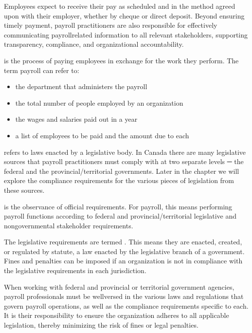 \documentclass[letterpaper,10pt,english]{sphinxmanual}
\begin{document}
\sphinxAtStartPar
Employees expect to receive their pay as scheduled and in the method agreed upon with their employer, whether by cheque or
direct deposit. Beyond ensuring timely payment, payroll practitioners are also responsible for effectively communicating
payroll\sphinxhyphen{}related information to all relevant stakeholders, supporting transparency, compliance, and organizational
accountability.

\sphinxAtStartPar
{} is the process of paying employees in exchange for the work they perform. The
term payroll can refer to:
\begin{itemize}
\item {} 
\sphinxAtStartPar
the department that administers the payroll

\item {} 
\sphinxAtStartPar
the total number of people employed by an organization

\item {} 
\sphinxAtStartPar
the wages and salaries paid out in a year

\item {} 
\sphinxAtStartPar
a list of employees to be paid and the amount due to each

\end{itemize}

\sphinxAtStartPar
{} refers to laws enacted by a legislative body. In Canada there are many legislative
sources that payroll practitioners must comply with at two separate levels ─ the federal and
the provincial/territorial governments. Later in the chapter we will explore the compliance
requirements for the various pieces of legislation from these sources.

\sphinxAtStartPar
{} is the observance of official requirements. For payroll, this means
performing payroll functions according to federal and provincial/territorial legislative and
non\sphinxhyphen{}governmental stakeholder requirements.

\sphinxAtStartPar
The legislative requirements are termed . This means they are enacted, created, or
regulated by statute, a law enacted by the legislative branch of a government. Fines and
penalties can be imposed if an organization is not in compliance with the legislative
requirements in each jurisdiction.

\sphinxAtStartPar
When working with federal and provincial or territorial government agencies, payroll professionals must be well\sphinxhyphen{}versed in
the various laws and regulations that govern payroll operations, as well as the compliance requirements specific to each.
It is their responsibility to ensure the organization adheres to all applicable legislation, thereby minimizing the risk of
fines or legal penalties.
\end{document}
